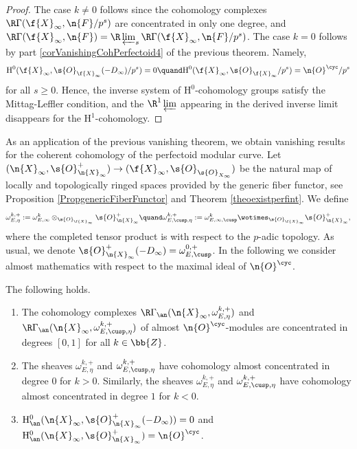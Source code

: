 \begin{proof}
The case $k\neq 0$ follows since the cohomology complexes $\R\Gamma(\f{X}_{\infty}, \n{F}/p^s)$ are concentrated in only one degree, and $\R \Gamma(\f{X}_{\infty},\n{F})=\R \varprojlim_s \R\Gamma(\f{X}_{\infty}, \n{F}/p^s)$. The case $k=0$ follows by part \eqref{corVanishingCohPerfectoid4} of the previous theorem. Namely,
\[
\mathrm{H}^0(\f{X}_{\infty}, \s{O}_{\f{X}_{\infty}}(-D_{\infty})/p^s)=0\quand\mathrm{H}^0(\f{X}_{\infty}, \s{O}_{\f{X}_{\infty}}/p^s)=\n{O}^{\cyc}/p^s
\]
for all $s\geq 0$. Hence, the inverse system of $\mathrm{H}^0$-cohomology groups satisfy the Mittag-Leffler condition, and the $\R^1 \varprojlim$ appearing in the derived inverse limit disappears for the $\mathrm{H}^1$-cohomology.
\end{proof}

As an application of the previous vanishing theorem, we obtain vanishing results for the coherent cohomology of the perfectoid modular curve. Let $(\n{X}_{\infty}, \s{O}_{\n{X}_{\infty}}^+)\to (\f{X}_{\infty}, \s{O}_{\s{O}_{X_{\infty}}})$ be the natural map of locally and topologically ringed spaces provided by the generic fiber functor, see Proposition \ref{PropgenericFiberFunctor} and Theorem \ref{theoexistperfint}. We define
\[
\omega^{k,+}_{E,\eta}:= \omega_{E,\infty}^k \otimes_{\s{O}_{\f{X}_{\infty}}} \s{O}_{\n{X}_{\infty}}^+\quand\omega^{k,+}_{E,\cusp,\eta}:=\omega_{E,\infty,\cusp}^k\wotimes_{\s{O}_{\f{X}_{\infty}}} \s{O}_{\n{X}_{\infty}}^+,
\]
where the completed tensor product is with respect to the $p$-adic topology. As usual, we denote $\s{O}_{\n{X}_{\infty}}^+(-D_{\infty})= \omega_{E,\cusp}^{0,+}$. In the following we consider almost mathematics with respect to the maximal ideal of $\n{O}^{\cyc}$.

\begin{cor}
\label{CoroCoherentPerfCurve}
The following holds.

\begin{enumerate}
\item The cohomology complexes $\R\Gamma_{\an}(\n{X}_{\infty}, \omega_{E,\eta}^{k,+})$ and $\R\Gamma_{\an}(\n{X}_{\infty}, \omega_{E,\cusp,\eta}^{k,+})$ of \hbox{almost} $\n{O}^{\cyc}$-modules are concentrated in degrees $[0,1]$ for all $k\in \bb{Z}$.

\item The sheaves $\omega_{E,\eta}^{k,+}$ and $\omega_{E,\cusp,\eta}^{k,+}$ have cohomology almost concentrated in degree $0$ for $k>0$. Similarly, the sheaves $\omega_{E,\eta}^{k,+}$ and $\omega_{E,\cusp,\eta}^{k,+}$ have cohomology almost concentrated in degree $1$ for $k<0$.

\item $\mathrm{H}_{\an}^0(\n{X}_{\infty}, \s{O}_{\n{X}_{\infty}}^+(-D_{\infty}))= 0$ and $\mathrm{H}_{\an}^0(\n{X}_{\infty}, \s{O}_{\n{X}_{\infty}}^+)= \n{O}^{\cyc} $.
\end{enumerate}
\end{cor}

